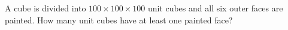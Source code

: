 A cube is divided into $100\times100\times100$ unit cubes and all six outer faces are painted. How many unit cubes have at least one painted face?
